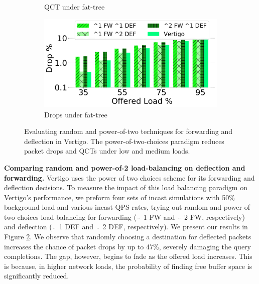\begin{figure}[t]
\begin{subfigure}[t]{.49\linewidth}
    	\caption{\small{QCT under fat-tree}}
	\end{subfigure}
	\hfill{}
	\begin{subfigure}[t]{.49\linewidth}
    	\centering
		\includegraphics[width=0.99\linewidth]{figs/powerofxdrops25fattree.pdf}
    	\caption{\small{Drops under fat-tree}}
    	\label{fig:lbdrops}
	\end{subfigure}
	\caption{\small{
    Evaluating random and power-of-two techniques for forwarding and deflection in Vertigo. The power-of-two-choices paradigm reduces packet drops and QCTs under low and medium loads.
	}}
	\label{fig:vertigo-lb}
	\vspace{-3mm}
\end{figure}

\textbf{Comparing random and power-of-2 load-balancing on deflection and forwarding.}
Vertigo uses the power of two choices scheme for its forwarding and deflection decisions. To measure the impact of this load balancing paradigm on Vertigo's performance, we preform four sets of incast simulations with 50\% background load and various incast QPS rates, trying out random and power of two choices load-balancing for forwarding (~$\widehat{}$~1 FW and ~$\widehat{}$~2 FW, respectively) and deflection (~$\widehat{}$~1 DEF and ~$\widehat{}$~2 DEF, respectively). We present our results in Figure \ref{fig:vertigo-lb}. We observe that randomly choosing a destination for deflected packets increases the chance of packet drops by up to 47\%, severely damaging the query completions. The gap, however, begins to fade as the offered load increases. This is because, in higher network loads, the probability of finding free buffer space is significantly reduced. 



